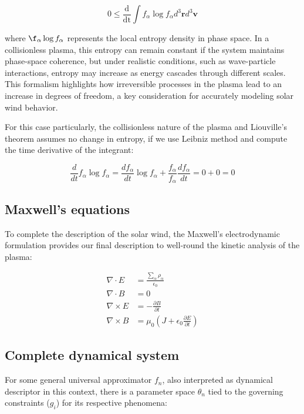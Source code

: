 \documentclass[12pt]{article}
\begin{document}
\begin{equation}
    0 \leq \frac{\mathrm{d}}{\mathrm{dt}} \int f_\alpha \log f_\alpha d^3\mathbf{r} d^3\mathbf{v}
\end{equation}

where $\f_\alpha \log f_\alpha$ represents the local entropy density in phase space. In a collisionless plasma, this entropy can remain constant if the system maintains phase-space coherence, but under realistic conditions, such as wave-particle interactions, entropy may increase as energy cascades through different scales. This formalism highlights how irreversible processes in the plasma lead to an increase in degrees of freedom, a key consideration for accurately modeling solar wind behavior.

For this case particularly, the collisionless nature of the plasma and Liouville's theorem assumes no change in entropy, if we use Leibniz method and compute the time derivative of the integrant:

\begin{equation}
    \frac{d}{dt} f_\alpha \log f_\alpha = \frac{df_\alpha}{dt} \log f_\alpha + \frac{f_\alpha}{f_\alpha}\frac{df_\alpha}{dt} = 0 + 0 = 0
\end{equation}

\subsection{Maxwell's equations}

To complete the description of the solar wind, the Maxwell's electrodynamic formulation provides our final description to well-round the kinetic analysis of the plasma:

\begin{align*}
    \nabla \cdot E &= \frac{\sum_{\alpha} \rho_\alpha}{\epsilon_0} \\
    \nabla \cdot B &= 0 \\
    \nabla \times E &= - \frac{\partial B}{\partial t} \\
    \nabla \times B &= \mu_0 \left(J + \epsilon_0 \frac{\partial E}{\partial t}\right)
\end{align*}

\subsection{Complete dynamical system}
For some general universal approximator $f_n$, also interpreted as dynamical descriptor in this context, there is a parameter space $\theta_n$ tied to the governing constraints ($g_i$) for its respective phenomena:
\end{document}
